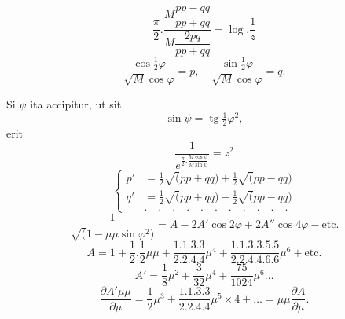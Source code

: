 \begin{equation*}\tag*{[23]}
\frac\pi2.\frac{M\dfrac{pp-qq}{pp+qq}}{M\dfrac{2pq}{pp+qq}}=\log.\frac1z
\end{equation*}
\begin{equation*}\tag*{[24]}
\frac{\cos\frac12\varphi}{\surd M\cos\varphi}=p,\quad
\frac{\sin\frac12\varphi}{\surd M\cos\varphi}=q.
\end{equation*}
\par\indent Si \(\psi\) ita accipitur, ut sit
\[\sin\psi=\operatorname{tg}\tfrac12\varphi^2,\]
\noindent erit
\begin{equation*}\tag*{[25]}
\frac1{e^{\frac\pi2.\frac{M\cos\psi}{M\sin\psi}}}=z^2
\end{equation*}
\begin{equation*}\tag*{[26]}
\left\{\begin{aligned}
p'&=\tfrac12\surd(pp+qq)+\tfrac12\surd(pp-qq)\\
q'&=\tfrac12\surd(pp+qq)-\tfrac12\surd(pp-qq)\\
&.\quad.\quad.\quad.\quad.\quad.\quad.\quad.\quad.\quad.\quad.
\end{aligned}\right.
\end{equation*}
\ClosingRule
{}
\noindent [S.\ 35]
\[\frac1{\surd(1-\mu\mu\sin\varphi^2)}=A-2A'\cos2\varphi+2A''\cos4\varphi-\text{etc.}\]
\[A=1+\frac12.\frac12\mu\mu+\frac{1.1.3.3}{2.2.4.4}\mu^4+\frac{1.1.3.3.5.5}{2.2.4.4.6.6}\mu^6+\text{etc.}\]
\[A'=\frac18\mu^2+\frac3{32}\mu^4+\frac{75}{1024}\mu^6\ldots\]
\[\frac{\partial A'\mu\mu}{\partial\mu}=\frac12\mu^3+\frac{1.1.3.3}{2.2.4.4}\mu^5\times4+\ldots=\mu\mu\frac{\partial A}{\partial\mu}.\]
\ClosingRule
\clearpage\endgroup
